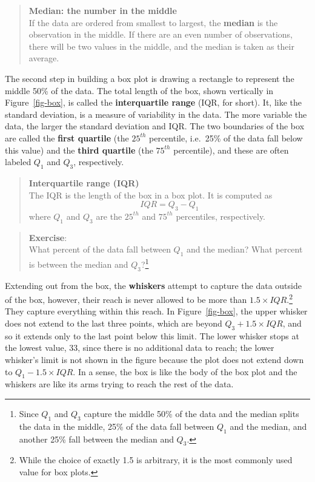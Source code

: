 \documentclass[
  letterpaper,
  DIV=11,
  numbers=noendperiod]{scrreprt}
\begin{document}
\begin{quote}
\textbf{Median: the number in the middle}\\
If the data are ordered from smallest to largest, the \textbf{median} is
the observation in the middle. If there are an even number of
observations, there will be two values in the middle, and the median is
taken as their average.
\end{quote}

The second step in building a box plot is drawing a rectangle to
represent the middle 50\% of the data. The total length of the box,
shown vertically in Figure~\ref{fig-box}, is called the
\textbf{interquartile range} (IQR, for short). It, like the standard
deviation, is a measure of variability in the data. The more variable
the data, the larger the standard deviation and IQR. The two boundaries
of the box are called the \textbf{first quartile} (the \(25^{th}\)
percentile, i.e.~25\% of the data fall below this value) and the
\textbf{third quartile} (the \(75^{th}\) percentile), and these are
often labeled \(Q_1\) and \(Q_3\), respectively.

\begin{quote}
\textbf{Interquartile range (IQR)}\\
The IQR is the length of the box in a box plot. It is computed as
\[ IQR = Q_3 - Q_1 \] where \(Q_1\) and \(Q_3\) are the \(25^{th}\) and
\(75^{th}\) percentiles, respectively.
\end{quote}

\begin{quote}
\textbf{Exercise}:\\
What percent of the data fall between \(Q_1\) and the median? What
percent is between the median and \(Q_3\)?\footnote{Since \(Q_1\) and
  \(Q_3\) capture the middle 50\% of the data and the median splits the
  data in the middle, 25\% of the data fall between \(Q_1\) and the
  median, and another 25\% fall between the median and \(Q_3\).}
\end{quote}

Extending out from the box, the \textbf{whiskers} attempt to capture the
data outside of the box, however, their reach is never allowed to be
more than \(1.5\times IQR\).\footnote{While the choice of exactly 1.5 is
  arbitrary, it is the most commonly used value for box plots.} They
capture everything within this reach. In Figure~\ref{fig-box}, the upper
whisker does not extend to the last three points, which are beyond
\(Q_3 + 1.5\times IQR\), and so it extends only to the last point below
this limit. The lower whisker stops at the lowest value, 33, since there
is no additional data to reach; the lower whisker's limit is not shown
in the figure because the plot does not extend down to
\(Q_1 - 1.5\times IQR\). In a sense, the box is like the body of the box
plot and the whiskers are like its arms trying to reach the rest of the
data.
\end{document}
